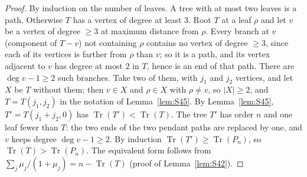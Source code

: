 \documentclass[11pt]{amsart}
\theoremstyle{definition}
\theoremstyle{remark}
\newcommand{\Tr}{\operatorname{Tr}}
\begin{document}
\begin{proof}
By induction on the number of leaves. A tree with at most two leaves is a
path. Otherwise $T$ has a vertex of degree at least $3$. Root $T$ at a leaf
$\rho$ and let $v$ be a vertex of degree $\ge3$ at maximum distance from
$\rho$. Every branch at $v$ (component of $T-v$) not containing $\rho$
contains no vertex of degree $\ge3$, since each of its vertices is farther
from $\rho$ than $v$; so it is a path, and its vertex adjacent to $v$ has
degree at most $2$ in $T$, hence is an end of that path. There are
$\deg v-1\ge2$ such branches. Take two of them, with $j_1$ and $j_2$
vertices, and let $X$ be $T$ without them; then $v\in X$ and $\rho\in X$
with $\rho\ne v$, so $|X|\ge2$, and $T=T(j_1,j_2)$ in the notation of
Lemma~\ref{lem:S45}. By Lemma~\ref{lem:S45}, $T'=T(j_1+j_2,0)$ has
$\Tr(T')<\Tr(T)$. The tree $T'$ has order $n$ and one leaf fewer than $T$:
the two ends of the two pendant paths are replaced by one, and $v$ keeps
degree $\deg v-1\ge2$. By induction $\Tr(T')\ge\Tr(P_n)$, so
$\Tr(T)>\Tr(P_n)$. The equivalent form follows from
$\sum_j\mu_j/(1+\mu_j)=n-\Tr(T)$ (proof of Lemma~\ref{lem:S42}).
\end{proof}
\end{document}
